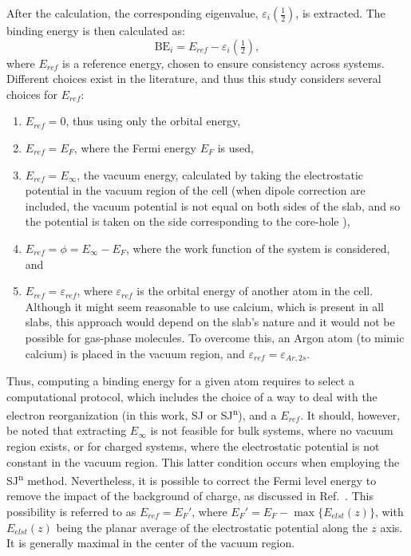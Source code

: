 \documentclass[journal=jpccck,manuscript=article]{achemso}
\begin{document}
After the calculation, the corresponding eigenvalue, $\varepsilon_i\left(\frac{1}{2}\right)$, is extracted. The binding energy is then calculated as:
\begin{equation}
	\text{BE}_i = 
	E_{ref}- \varepsilon_i\left(\tfrac{1}{2}\right), \label{eq:xpsbe}
\end{equation}
where $E_{ref}$ is a reference energy, chosen to ensure consistency across systems. Different choices exist in the literature, and thus this study considers several choices for $E_{ref}$:
\begin{enumerate}
	\item $E_{ref}=0$, thus using only the orbital energy,
	\item $E_{ref}=E_F$, where the Fermi energy $E_F$ is used, 
	\item $E_{ref}=E_\infty$, the vacuum energy, calculated by taking the electrostatic potential in the vacuum region of the cell (when dipole correction are included, the vacuum potential is not equal on both sides of the slab, and so the potential is taken on the side corresponding to the core-hole \cite{montiInfluenceElectrostaticFields2010}),
	\item $E_{ref}=\phi =  E_\infty - E_F$, where the work function of the system is considered\cite{kahnFermiLevelWork2015}, and
	\item $E_{ref}= \varepsilon_{ref}$, where $\varepsilon_{ref}$ is the orbital energy of another atom in the cell. Although it might seem reasonable to use calcium, which is present in all slabs, this approach would depend on the slab's nature and it would not be possible for gas-phase molecules. To overcome this, an Argon atom (to mimic calcium) is placed in the vacuum region, and $\varepsilon_{ref}=\varepsilon_{Ar,2s}$.
\end{enumerate}
Thus, computing a binding energy for a given atom requires to select a computational protocol, which includes the choice of a  way to deal with the electron reorganization  (in this work, SJ or SJ\textsuperscript{n}), and a $E_{ref}$.
It should, however, be noted that extracting $E_\infty$ is not feasible for bulk systems, where no vacuum region exists, or for charged systems, where the electrostatic potential is not constant in the vacuum region. This latter condition occurs when employing the SJ\textsuperscript{n} method. Nevertheless, it is possible to correct the Fermi level energy to remove the impact of the background of charge, as discussed in Ref.~. This possibility is referred to as $E_{ref}=E_F'$, where $E_F' = E_F - \max\{E_{elst}(z)\}$, with $E_{elst}(z)$ being the planar average of the electrostatic potential along the $z$ axis. It is generally maximal in the center of the vacuum region. 
\end{document}
